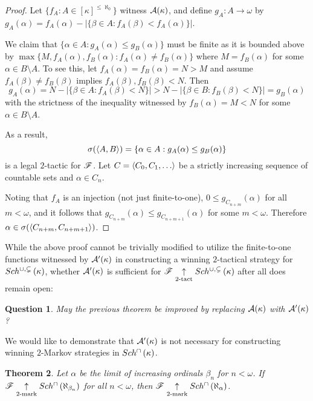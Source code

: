 \documentclass{rmmcart}
\theoremstyle{plain}
\newtheorem{theorem}{Theorem}
\newtheorem{question}[theorem]{Question}
\theoremstyle{definition}
\theoremstyle{remark}
\theoremstyle{plain}
\theoremstyle{definition}
\theoremstyle{remark}
\begin{document}
  \begin{proof}
    Let \(\{f_A:A\in[\kappa]^{\leq\aleph_0}\}\) witness
    \(\mathcal{A}(\kappa)\), and define \(g_A:A\to\omega\) by
    \(g_A(\alpha)=f_A(\alpha)-|\{\beta\in A:f_A(\beta)<f_A(\alpha)\}|\).

    We claim that \(\{\alpha\in A:g_A(\alpha)\leq g_B(\alpha)\}\)
    must be finite as it is bounded above by
    \(\max\{M,f_A(\alpha),f_B(\alpha):f_A(\alpha)\not=f_B(\alpha)\}\)
    where \(M=f_B(\alpha)\) for some \(\alpha\in B\setminus A\).
    To see this, let \(f_A(\alpha)=f_B(\alpha)=N>M\) and assume
    \(f_A(\beta)\not=f_B(\beta)\) implies \(f_A(\beta),f_B(\beta)<N\).
    Then
    \[
      g_A(\alpha)
        =
      N-|\{\beta\in A:f_A(\beta)<N\}|
        >
      N-|\{\beta\in B:f_B(\beta)<N\}|
        =
      g_B(\alpha)
    \]
    with the strictness of the inequality witnessed by \(f_B(\alpha)=M<N\)
    for some \(\alpha\in B\setminus A\).

    As a result,
    \[
      \sigma(\langle A,B\rangle)
        =
      \{\alpha\in A:g_A(\alpha)\leq g_B(\alpha)\}
    \]
    is a legal \(2\)-tactic for \(\mathscr{F}\). Let \(C=\<C_0,C_1,\dots\>\) be
    a strictly increasing sequence of countable sets and
    \(\alpha\in C_n\).

    Noting that \(f_A\) is an injection
    (not just finite-to-one), \(0\leq g_{C_{n+m}}(\alpha)\) for all
    \(m<\omega\), and it follows that
    \(g_{C_{n+m}}(\alpha)\leq g_{C_{n+m+1}}(\alpha)\) for some \(m<\omega\).
    Therefore \(\alpha\in\sigma(\langle C_{n+m},C_{n+m+1}\rangle)\).
  \end{proof}

  While the above proof cannot be trivially modified to utilize
  the finite-to-one functions witnessed by
  \(\mathcal{A}'(\kappa)\) in constructing a winning \(2\)-tactical strategy
  for \(Sch^{\cup,\subsetneq}\left({\kappa}\right)\), whether
  \(\mathcal{A}'(\kappa)\) is sufficient for
  \(\mathscr{F}\underset{2\text{-tact}}{\uparrow}Sch^{\cup,\subsetneq}\left({\kappa}\right)\) after all
  does remain open:

  \begin{question}
    May the previous theorem be improved by replacing \(\mathcal{A}(\kappa)\)
    with \(\mathcal{A}'(\kappa)\)?
  \end{question}

  We would like to demonstrate that \(\mathcal{A}'(\kappa)\) is not
  necessary for constructing winning \(2\)-Markov strategies in
  \(Sch^{\cap}\left({\kappa}\right)\).

  \begin{theorem}
    Let \(\alpha\) be the limit of increasing ordinals \(\beta_n\) for \(n<\omega\).
    If \(\mathscr{F} \underset{2\text{-mark}}{\uparrow}Sch^{\cap}\left({\aleph_{\beta_n}}\right)\) for all
    \(n<\omega\), then \(\mathscr{F}\underset{2\text{-mark}}{\uparrow}Sch^{\cap}\left({\aleph_\alpha}\right)\).
  \end{theorem}
\end{document}
